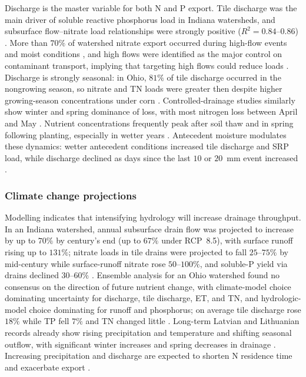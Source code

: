 Discharge is the master variable for both N and P export. Tile discharge
was the main driver of soluble reactive phosphorus load in Indiana
watersheds, and subsurface flow--nitrate load relationships were strongly
positive ($R^2 = 0.84$--$0.86$) \parencite{Trentman2020,Dattamudi2020}.
More than $70\%$ of watershed nitrate export occurred during high-flow
events and moist conditions \parencite{Hanrahan2018}, and high flows were
identified as the major control on contaminant transport, implying that
targeting high flows could reduce loads \parencite{Ghane2016b}. Discharge
is strongly seasonal: in Ohio, $81\%$ of tile discharge occurred in the
nongrowing season, so nitrate and TN loads were greater then despite
higher growing-season concentrations under corn \parencite{King2016}.
Controlled-drainage studies similarly show winter and spring dominance of
loss, with most nitrogen loss between April and May
\parencite{Strock2025b,Grenon2023}. Nutrient concentrations frequently
peak after soil thaw and in spring following planting, especially in
wetter years \parencite{Magner2004,Smith2008,Bechmann2014}. Antecedent
moisture modulates these dynamics: wetter antecedent conditions increased
tile discharge and SRP load, while discharge declined as days since the
last $10$ or $20$~mm event increased \parencite{Trentman2020}.

\subsubsection{Climate change projections}

Modelling indicates that intensifying hydrology will increase drainage
throughput. In an Indiana watershed, annual subsurface drain flow was
projected to increase by up to $70\%$ by century's end (up to $67\%$ under
RCP~8.5), with surface runoff rising up to $131\%$; nitrate loads in tile
drains were projected to fall $25$--$75\%$ by mid-century while surface-runoff
nitrate rose $50$--$100\%$, and soluble-P yield via drains declined
$30$--$60\%$ \parencite{Mehan2019}. Ensemble analysis for an Ohio watershed
found no consensus on the direction of future nutrient change, with
climate-model choice dominating uncertainty for discharge, tile discharge,
ET, and TN, and hydrologic-model choice dominating for runoff and
phosphorus; on average tile discharge rose $18\%$ while TP fell $7\%$ and
TN changed little \parencite{Kujawa2020}. Long-term Latvian and Lithuanian
records already show rising precipitation and temperature and shifting
seasonal outflow, with significant winter increases and spring decreases
in drainage \parencite{Lagzdins2015,Povilaitis2018}. Increasing
precipitation and discharge are expected to shorten N residence time and
exacerbate export \parencite{Raymond2012}.

